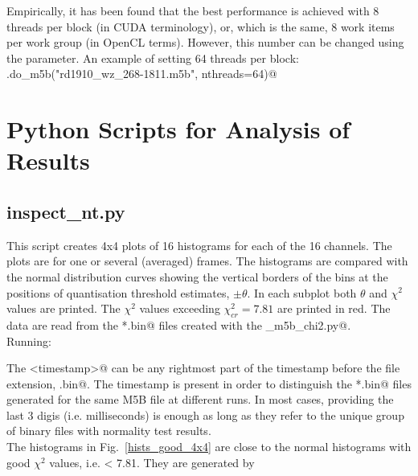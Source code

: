 \documentclass[letterpaper,twoside,12pt]{article}
\begin{document}
Empirically, it has been found that the best performance is achieved 
with 8 threads per block (in CUDA terminology), or, which is the same, 
8 work items per work group (in OpenCL terms). However, this number can 
be changed using the \verb@nthreads@ parameter. An example of setting 64 threads per block: \\

\noindent \verb@nt.do_m5b("rd1910_wz_268-1811.m5b", nthreads=64)@ \\


\section{Python Scripts for Analysis of Results}

\subsection{inspect\_nt.py}

This script creates 4x4 plots of 16 histograms for each of the 16 channels. The plots are for one or several (averaged) frames. The histograms are compared with the normal distribution curves showing the vertical borders of the bins at the positions of quantisation threshold estimates, $\pm\theta$. In each subplot both $\theta$ and $\chi^2$ values are printed. The $\chi^2$ values exceeding $\chi^2_{cr} = 7.81$ are printed in red. The data are read from the \verb@*.bin@ files created with the \verb@gpu_m5b_chi2.py@. \\

\noindent Running: \\

\noindent \verb@%run inspect_nt.py <m5b_filename> <timestamp> <start_frame_#> <#_of_frames> @ \\

The \verb@<timestamp>@ can be any rightmost part of the timestamp before the file extension, \verb@.bin@. The timestamp is present in order to distinguish the \verb@*.bin@ files generated for the same M5B file at different runs. In most cases, providing the last 3 digis (i.e. milliseconds) is enough as long as they refer to the unique group of binary files with normality test results. \\

The histograms in Fig.~\ref{hists_good_4x4} are close to the normal histograms with good $\chi^2$ values, i.e. < 7.81. They are generated by \\
\end{document}
